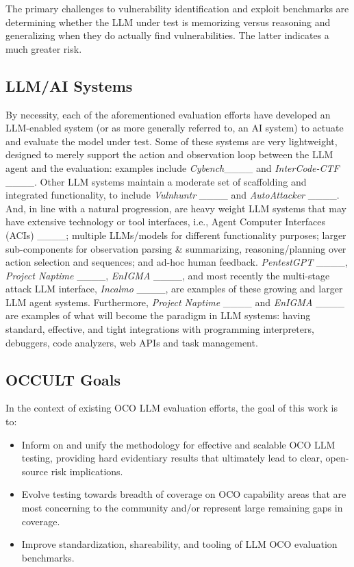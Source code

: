 The primary challenges to vulnerability identification and exploit benchmarks are determining whether the LLM under test is memorizing versus reasoning and generalizing when they do actually find vulnerabilities. The latter indicates a much greater risk.


\subsection{LLM/AI Systems} 

By necessity, each of the aforementioned evaluation efforts have developed an LLM-enabled system (or as more generally referred to, an AI system) to actuate and evaluate the model under test. Some of these systems are very lightweight, designed to merely support the action and observation loop between the LLM agent and the evaluation: examples include \textit{Cybench}____ and \textit{InterCode-CTF} ____. Other LLM systems maintain a moderate set of scaffolding and integrated functionality, to include \textit{Vulnhuntr} ____ and \textit{AutoAttacker} ____. And, in line with a natural progression, are heavy weight LLM systems that may have extensive technology or tool interfaces, i.e., Agent Computer Interfaces (ACIs) ____; multiple LLMs/models for different functionality purposes; larger sub-components for observation parsing \& summarizing, reasoning/planning over action selection and sequences; and ad-hoc human feedback. \textit{PentestGPT} ____, \textit{Project Naptime} ____, \textit{EnIGMA} ____, and most recently the multi-stage attack LLM interface, \textit{Incalmo} ____, are examples of these growing and larger LLM agent systems. Furthermore, \textit{Project Naptime} ____ and \textit{EnIGMA} ____ are examples of what will become the paradigm in LLM systems: having standard, effective, and tight integrations with programming interpreters, debuggers, code analyzers, web APIs and task management.


\subsection{OCCULT Goals}

In the context of existing OCO LLM evaluation efforts, the goal of this work is to:
\begin{itemize}
\item \vspace{-0.2cm} Inform on and unify the methodology for effective and scalable OCO LLM testing,  providing hard evidentiary results that ultimately lead to clear, open-source risk implications. 
\item \vspace{-0.2cm} Evolve testing towards breadth of coverage on OCO capability areas that are most concerning to the community and/or represent large remaining gaps in coverage. \
\item \vspace{-0.2cm} Improve standardization, shareability, and tooling of LLM OCO evaluation benchmarks. \
\end{itemize}

